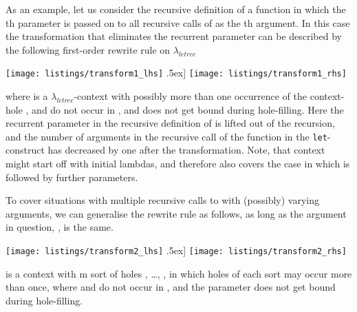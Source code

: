 \documentclass[submission,copyright,creativecommons]{eptcs}
\newcommand{\lambdaletrec}{\ensuremath{\lambda_\textit{letrec}}}
\newcommand{\nbd}{\nobreakdash}
\renewcommand\;{\,}
\begin{document}
As an example, let us consider the recursive definition of a function  in
which the th parameter  is passed on to all recursive calls of  as
the th argument.
In this case the transformation that eliminates the recurrent parameter 
can be described by the following first-order rewrite rule on \lambdaletrec
\begin{samepage}
\begin{flushleft}
\vspace*{-0.5ex}
  \hspace*{6ex}\texttt{[image: listings/transform1\_lhs]}
  \nopagebreak[4]\0.5ex]
  \hspace*{6ex}\texttt{[image: listings/transform1\_rhs]}
\end{flushleft}
\end{samepage}
\vspace{-0.5ex}
where  is a \lambdaletrec\nbd-context with possibly more than one occurrence of the context-hole ,
 and  do not occur in , and  does not get bound during hole-filling.
Here the recurrent parameter  in the recursive definition of  is lifted out
of the recursion, and the number of arguments in the recursive call of the function in
the {\tt let}\nbd-construct has decreased by one after the transformation.
Note, that context  might start off with initial lambdas, and therefore
also covers the case in which  is followed by further parameters.

To cover situations with multiple recursive calls to  with (possibly)
varying arguments, we can generalise the rewrite rule as follows, as long as
the argument in question, , is the same.
\begin{flushleft}
\vspace*{-0.5ex}
  \hspace*{6ex}\texttt{[image: listings/transform2\_lhs]}
  \0.5ex]
  \hspace*{6ex}\texttt{[image: listings/transform2\_rhs]}
\end{flushleft}
 is a context with m sort of holes , \ldots, , 
in which holes of each sort may occur more than once,
where  and  do not occur in , and
the parameter  does not get bound during hole-filling.
\end{document}
